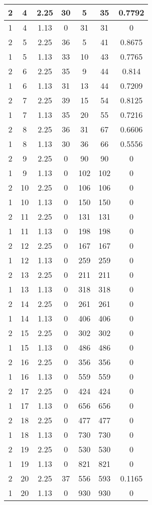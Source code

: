 \documentclass[letterpaper, 12pt]{article}
\begin{document}
\begin{longtable}{|c|c|c|c|c|c|c|}
\hline
2 & 4 & 2.25 & 30 & 5 & 35 & 0.7792 \\
\hline
1 & 4 & 1.13 & 0 & 31 & 31 & 0 \\
\hline
2 & 5 & 2.25 & 36 & 5 & 41 & 0.8675 \\
\hline
1 & 5 & 1.13 & 33 & 10 & 43 & 0.7765 \\
\hline
2 & 6 & 2.25 & 35 & 9 & 44 & 0.814 \\
\hline
1 & 6 & 1.13 & 31 & 13 & 44 & 0.7209 \\
\hline
2 & 7 & 2.25 & 39 & 15 & 54 & 0.8125 \\
\hline
1 & 7 & 1.13 & 35 & 20 & 55 & 0.7216 \\
\hline
2 & 8 & 2.25 & 36 & 31 & 67 & 0.6606 \\
\hline
1 & 8 & 1.13 & 30 & 36 & 66 & 0.5556 \\
\hline
2 & 9 & 2.25 & 0 & 90 & 90 & 0 \\
\hline
1 & 9 & 1.13 & 0 & 102 & 102 & 0 \\
\hline
2 & 10 & 2.25 & 0 & 106 & 106 & 0 \\
\hline
1 & 10 & 1.13 & 0 & 150 & 150 & 0 \\
\hline
2 & 11 & 2.25 & 0 & 131 & 131 & 0 \\
\hline
1 & 11 & 1.13 & 0 & 198 & 198 & 0 \\
\hline
2 & 12 & 2.25 & 0 & 167 & 167 & 0 \\
\hline
1 & 12 & 1.13 & 0 & 259 & 259 & 0 \\
\hline
2 & 13 & 2.25 & 0 & 211 & 211 & 0 \\
\hline
1 & 13 & 1.13 & 0 & 318 & 318 & 0 \\
\hline
2 & 14 & 2.25 & 0 & 261 & 261 & 0 \\
\hline
1 & 14 & 1.13 & 0 & 406 & 406 & 0 \\
\hline
2 & 15 & 2.25 & 0 & 302 & 302 & 0 \\
\hline
1 & 15 & 1.13 & 0 & 486 & 486 & 0 \\
\hline
2 & 16 & 2.25 & 0 & 356 & 356 & 0 \\
\hline
1 & 16 & 1.13 & 0 & 559 & 559 & 0 \\
\hline
2 & 17 & 2.25 & 0 & 424 & 424 & 0 \\
\hline
1 & 17 & 1.13 & 0 & 656 & 656 & 0 \\
\hline
2 & 18 & 2.25 & 0 & 477 & 477 & 0 \\
\hline
1 & 18 & 1.13 & 0 & 730 & 730 & 0 \\
\hline
2 & 19 & 2.25 & 0 & 530 & 530 & 0 \\
\hline
1 & 19 & 1.13 & 0 & 821 & 821 & 0 \\
\hline
2 & 20 & 2.25 & 37 & 556 & 593 & 0.1165 \\
\hline
1 & 20 & 1.13 & 0 & 930 & 930 & 0 \\
\hline
\end{longtable}
\end{document}
